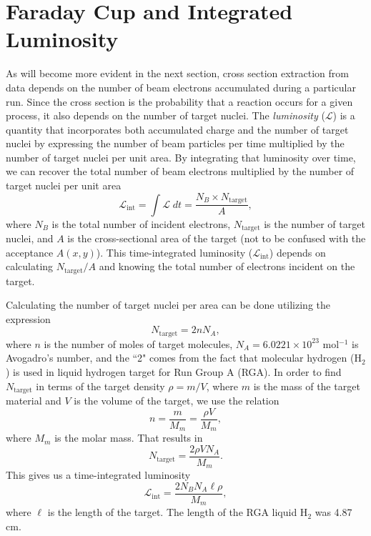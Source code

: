 \section{Faraday Cup and Integrated Luminosity}
As will become more evident in the next section, cross section extraction from data depends on the number of beam electrons accumulated during a particular run. Since the cross section is the probability that a reaction occurs for a given process, it also depends on the number of target nuclei. The \textit{luminosity} ($\mathscr{L}$) is a quantity that incorporates both accumulated charge and the number of target nuclei by expressing the number of beam particles per time multiplied by the number of target nuclei per unit area. By integrating that luminosity over time, we can recover the total number of beam electrons multiplied by the number of target nuclei per unit area
\begin{equation}
\mathscr{L_{\mathrm{int}}} = \int \mathscr{L} \; dt = \frac{N_{B} \times N_{\mathrm{target}}}{A},
\end{equation}
where $N_{B}$ is the total number of incident electrons, $N_{\mathrm{target}}$ is the number of target nuclei, and $A$ is the cross-sectional area of the target (not to be confused with the acceptance $A(x,y)$). This time-integrated luminosity ($\mathscr{L}_{\mathrm{int}}$) depends on calculating $N_{\mathrm{target}}/A$ and knowing the total number of electrons incident on the target.

Calculating the number of target nuclei per area can be done utilizing the expression
\begin{equation}
N_{\mathrm{target}} = 2nN_A,
\end{equation}
where $n$ is the number of moles of target molecules, $N_A = 6.0221 \times 10^{23}$ mol$^{-1}$ is Avogadro's number, and the ``2" comes from the fact that molecular hydrogen (H$_2$) is used in liquid hydrogen target for Run Group A (RGA). In order to find $N_{\mathrm{target}}$ in terms of the target density $\rho = m/V$, where $m$ is the mass of the target material and $V$ is the volume of the target, we use the relation 
\begin{equation}
n = \frac{m}{M_m} = \frac{\rho V}{M_m},
\end{equation}
where $M_m$ is the molar mass. That results in
\begin{equation}
N_{\mathrm{target}} = \frac{2\rho V N_A}{M_m}.
\end{equation} 
This gives us a time-integrated luminosity
\begin{equation}
\mathscr{L}_{\mathrm{int}} = \frac{2N_B N_A \ell \rho}{M_m},
\end{equation}
where $\ell$ is the length of the target. The length of the RGA liquid H$_2$ was 4.87 cm.

